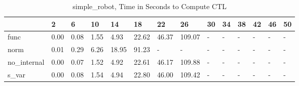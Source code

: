 \begin{table}
\caption{simple_robot, Time in Seconds to Compute CTL}
\label{simple_robot_CTL_time}
\begin{tabular}{llllllllllllll}
\toprule
 & 2 & 6 & 10 & 14 & 18 & 22 & 26 & 30 & 34 & 38 & 42 & 46 & 50 \\
\midrule
func & 0.00 & 0.08 & 1.55 & 4.93 & 22.62 & 46.37 & 109.07 & - & - & - & - & - & - \\
norm & 0.01 & 0.29 & 6.26 & 18.95 & 91.23 & - & - & - & - & - & - & - & - \\
no_internal & 0.00 & 0.07 & 1.52 & 4.92 & 22.61 & 46.17 & 109.88 & - & - & - & - & - & - \\
s_var & 0.00 & 0.08 & 1.54 & 4.94 & 22.80 & 46.00 & 109.42 & - & - & - & - & - & - \\
\bottomrule
\end{tabular}
\end{table}
